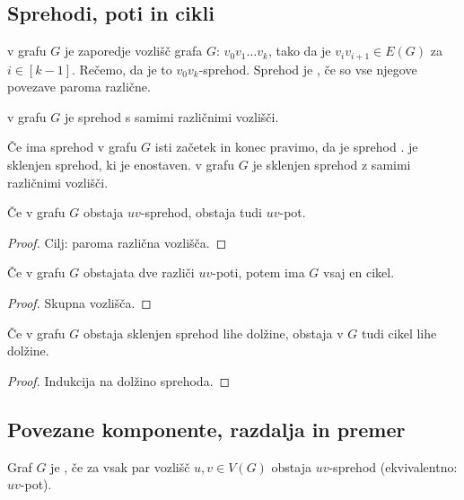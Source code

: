 \subsection{Sprehodi, poti in cikli}
\begin{definicija}
     v grafu $G$ je zaporedje vozlišč grafa $G$: $v_0v_1\ldots v_k$, tako da je $v_iv_{i+1} \in E(G)$ za $i \in [k-1]$. Rečemo, da je to $v_0v_k$-sprehod. Sprehod je , če so vse njegove povezave paroma različne.
\end{definicija}

\begin{definicija}
     v grafu $G$ je sprehod s samimi različnimi vozlišči.
\end{definicija}

\begin{definicija}
    Če ima sprehod v grafu $G$ isti začetek in konec pravimo, da je sprehod .  je sklenjen sprehod, ki je enostaven.  v grafu $G$ je sklenjen sprehod z samimi različnimi vozlišči.
\end{definicija}

\begin{lema}
    Če v grafu $G$ obstaja $uv$-sprehod, obstaja tudi $uv$-pot.
\end{lema}

\begin{proof}
    Cilj: paroma različna vozlišča.
\end{proof}

\begin{lema}
    Če v grafu $G$ obstajata dve različi $uv$-poti, potem ima $G$ vsaj en cikel.
\end{lema}

\begin{proof}
    Skupna vozlišča.
\end{proof}

\begin{lema}
    Če v grafu $G$ obstaja sklenjen sprehod lihe dolžine, obstaja v $G$ tudi cikel lihe dolžine.
\end{lema}

\begin{proof}
    Indukcija na dolžino sprehoda.
\end{proof}

\subsection{Povezane komponente, razdalja in premer}
\begin{definicija}
    Graf $G$ je , če za vsak par vozlišč $u, v \in V(G)$ obstaja $uv$-sprehod (ekvivalentno: $uv$-pot).
\end{definicija}

